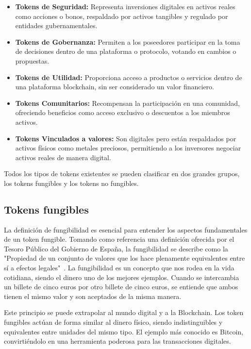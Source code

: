 \begin{itemize}
\item \textbf{Tokens de Seguridad:} Representa inversiones digitales en activos reales como acciones o bonos, respaldado por activos tangibles y regulado por entidades gubernamentales.
\item \textbf{Tokens de Gobernanza:} Permiten a los poseedores participar en la toma de decisiones dentro de una plataforma o protocolo, votando en cambios o propuestas.
\item \textbf{Tokens de Utilidad:} Proporciona acceso a productos o servicios dentro de una plataforma blockchain, sin ser considerado un valor financiero.
\item \textbf{Tokens Comunitarios:} Recompensan la participación en una comunidad, ofreciendo beneficios como acceso exclusivo o descuentos a los miembros activos.
\item \textbf{Tokens Vinculados a valores:} Son digitales pero están respaldados por activos físicos como metales preciosos, permitiendo a los inversores negociar activos reales de manera digital.

\end{itemize}

Todos los tipos de tokens existentes se pueden clasificar en dos grandes grupos, los tokens fungibles y los tokens no fungibles.


\subsection{Tokens fungibles}

La definición de fungibilidad es esencial para entender los aspectos fundamentales de un token fungible. Tomando como referencia una definición ofrecida por el Tesoro Público del Gobierno de España, la fungibilidad se describe como la "Propiedad de un conjunto de valores que los hace plenamente equivalentes entre sí a efectos legales"~\cite{fungibilidadGob}.
La fungibilidad es un concepto que nos rodea en la vida cotidiana, siendo el dinero uno de los mejores ejemplos. Cuando se intercambia un billete de cinco euros por otro billete de cinco euros, se entiende que ambos tienen el mismo valor y son aceptados de la misma manera.

Este principio se puede extrapolar al mundo digital y a la Blockchain. Los token fungibles actúan de forma similar al dinero físico, siendo indistinguibles y equivalentes entre unidades del mismo tipo.
El ejemplo más conocido es Bitcoin, convirtiéndolo en una herramienta poderosa para las transacciones digitales.


